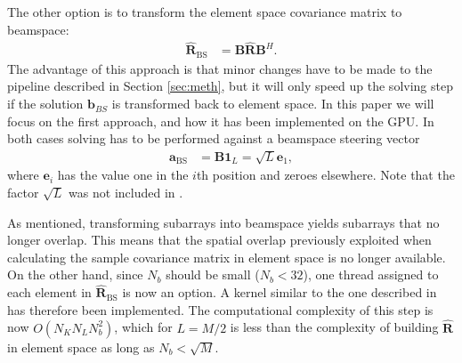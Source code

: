 \documentclass[journal]{IEEEtran}
\newcommand{\mat}[1]{\mathbf{#1}}
\renewcommand{\vec}[1]{\mathbf{#1}}
\begin{document}
The other option is to transform the element space covariance matrix to beamspace:
\begin{align}
\mat{\hat{R}}_\text{BS} &= \mat{B}\mat{\hat{R}}\mat{B}^H.
\end{align}
The advantage of this approach is that minor changes have to be made to the pipeline described in Section \ref{sec:meth}, but it will only speed up the solving step if the solution $\vec{b}_{BS}$ is transformed back to element space. In this paper we will focus on the first approach, and how it has been implemented on the GPU.
In both cases solving has to be performed against a beamspace steering vector
\begin{align}
\vec{a}_\text{BS} &= \mat{B}\vec{1}_L = \sqrt{L}\vec{e}_1,
\end{align}
where $\vec{e}_i$ has the value one in the $i$th position and zeroes elsewhere. Note that the factor $\sqrt{L}$ was not included in \cite{Nilsen2009}.

As mentioned, transforming subarrays into beamspace yields subarrays that no longer overlap. This means that the spatial overlap previously exploited when calculating the sample covariance matrix in element space is no longer available. On the other hand, since $N_b$ should be small ($N_b < 32$), one thread assigned to each element in $\mat{\hat{R}}_\text{BS}$ is now an option. A kernel similar to the one described in \cite{Chen2011} has therefore been implemented. The computational complexity of this step is now $O(N_KN_LN_b^2)$, which for $L=M/2$ is less than the complexity of building $\mat{\hat{R}}$ in element space as long as $N_b < \sqrt{M}$.
\end{document}

